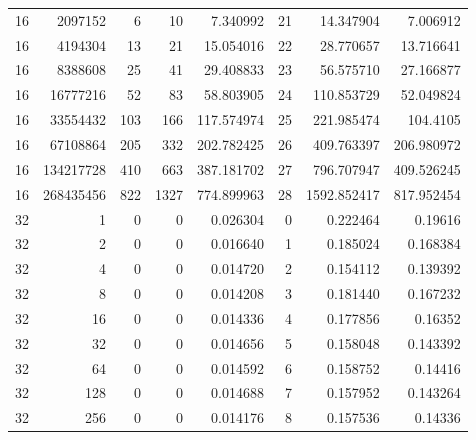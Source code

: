 \begin{longtable}[c]{@{}rrrrrrrr@{}}
    16        & 2097152   & 6         & 10       & 7.340992    & 21                  & 14.347904   & 7.006912   \\
    16        & 4194304   & 13        & 21       & 15.054016   & 22                  & 28.770657   & 13.716641  \\
    16        & 8388608   & 25        & 41       & 29.408833   & 23                  & 56.575710   & 27.166877  \\
    16        & 16777216  & 52        & 83       & 58.803905   & 24                  & 110.853729  & 52.049824  \\
    16        & 33554432  & 103       & 166      & 117.574974  & 25                  & 221.985474  & 104.4105   \\
    16        & 67108864  & 205       & 332      & 202.782425  & 26                  & 409.763397  & 206.980972 \\
    16        & 134217728 & 410       & 663      & 387.181702  & 27                  & 796.707947  & 409.526245 \\
    16        & 268435456 & 822       & 1327     & 774.899963  & 28                  & 1592.852417 & 817.952454 \\
    32        & 1         & 0         & 0        & 0.026304    & 0                   & 0.222464    & 0.19616    \\
    32        & 2         & 0         & 0        & 0.016640    & 1                   & 0.185024    & 0.168384   \\
    32        & 4         & 0         & 0        & 0.014720    & 2                   & 0.154112    & 0.139392   \\
    32        & 8         & 0         & 0        & 0.014208    & 3                   & 0.181440    & 0.167232   \\
    32        & 16        & 0         & 0        & 0.014336    & 4                   & 0.177856    & 0.16352    \\
    32        & 32        & 0         & 0        & 0.014656    & 5                   & 0.158048    & 0.143392   \\
    32        & 64        & 0         & 0        & 0.014592    & 6                   & 0.158752    & 0.14416    \\
    32        & 128       & 0         & 0        & 0.014688    & 7                   & 0.157952    & 0.143264   \\
    32        & 256       & 0         & 0        & 0.014176    & 8                   & 0.157536    & 0.14336    \\

\end{longtable}
